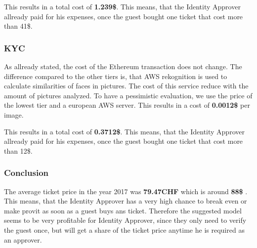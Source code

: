 This results in a total cost of \textbf{1.239\$}. This means, that the Identity Approver allready paid for his expenses, once the guest bought one ticket that cost more than 41\$. 

\subsubsection{KYC}
As allready stated, the cost of the Ethereum transaction does not change. The difference compared to the other tiers is, that AWS rekognition is used to calculate similarities of faces in pictures. The cost of this service reduce with the amount of pictures analyzed. To have a pessimistic evaluation, we use the price of the lowest tier and a european AWS server. This results in a cost of \textbf{0.0012\$} per image\cite{AWS-Cost}.

This results in a total cost of \textbf{0.3712\$}. This means, that the Identity Approver allready paid for his expenses, once the guest bought one ticket that cost more than 12\$. 

\subsubsection{Conclusion}
The average ticket price in the year 2017 was \textbf{79.47CHF} which is around\textbf{ 88\$} \cite{Ticket-Price}. This means, that the Identity Approver has a very high chance to break even or make provit as soon as a guest buys ans ticket. Therefore the suggested model seems to be very profitable for Identity Approver, since they only need to verify the guest once, but will get a share of the ticket price anytime he is required as an approver. 

